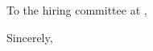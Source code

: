 \documentclass[letterpaper,11pt]{letter}
\begin{document}
\begin{letter}{}

\opening{To the hiring committee at ,}


\closing{Sincerely, }
\end {letter}
\end{document}
